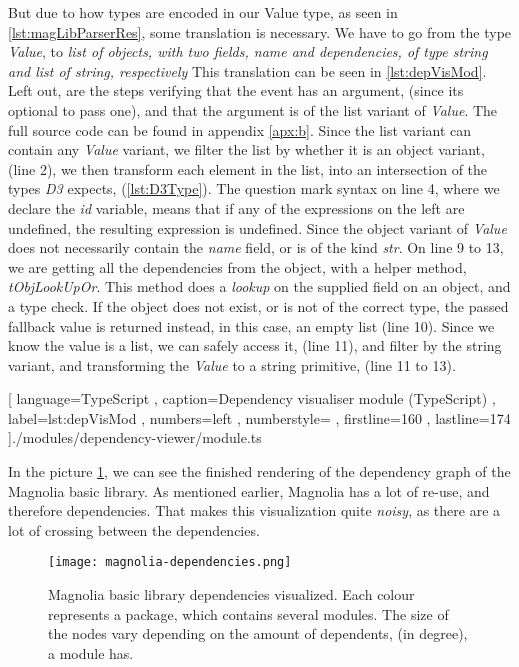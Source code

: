 But due to how types are encoded in our Value type, as seen in
\ref{lst:magLibParserRes}, some translation is necessary. We have to go from the
type \textit{Value}, to
\textit{
  list of objects, with two fields, name and dependencies, of type string and
  list of string, respectively}
This translation can be seen in \ref{lst:depVisMod}. Left out, are the steps
verifying that the event has an argument, (since its optional to pass one), and
that the argument is of the list variant of \textit{Value}. The full source code
can be found in appendix \ref{apx:b}. Since the list variant can contain any
\textit{Value} variant, we filter the list by whether it is an object variant,
(line 2), we then transform each element in the list, into an intersection of the
types \textit{D3} expects, (\ref{lst:D3Type}). The question mark syntax on line
4, where we declare the \textit{id} variable, means that if any of the
expressions on the left are undefined, the resulting expression is undefined.
Since the object variant of \textit{Value} does not necessarily contain the
\textit{name} field, or is of the kind \textit{str}. On line 9 to 13, we are
getting all the dependencies from the object, with a helper method,
\textit{tObjLookUpOr}. This method does a \textit{lookup} on the supplied field
on an object, and a type check. If the object does not exist, or is not of the
correct type, the passed fallback value is returned instead, in this case, an
empty list (line 10). Since we know the value is a list, we can safely access
it, (line 11), and filter by the string variant, and transforming the
\textit{Value} to a string primitive, (line 11 to 13).

\begin{code}[H]
  
    [ language=TypeScript
    , caption={Dependency visualiser module (TypeScript)}
    , label=lst:depVisMod
    , numbers=left
    , numberstyle=\tiny\color{gray}
    , firstline=160
    , lastline=174
    ]{./modules/dependency-viewer/module.ts}
\end{code}

In the picture \ref{pic:magLib}, we can see the finished rendering of the
dependency graph of the Magnolia basic library. As mentioned earlier, Magnolia
has a lot of re-use, and therefore dependencies. That makes this visualization
quite \textit{noisy}, as there are a lot of crossing between the dependencies.

\begin{figure}[H]
  \centering
  \texttt{[image: magnolia-dependencies.png]}
  \caption{
    Magnolia basic library dependencies visualized. Each colour represents a
    package, which contains several modules. The size of the nodes vary
    depending on the amount of dependents, (in degree), a module has.
  }
  \label{pic:magLib}
\end{figure}

